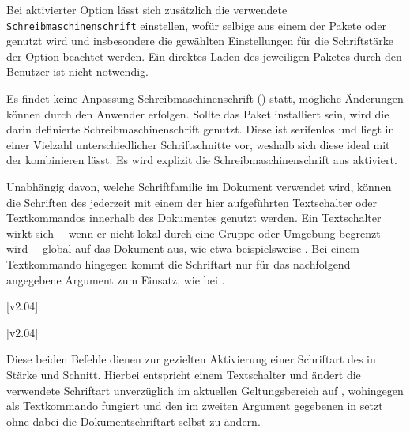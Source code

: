 \begin{DeclareEntity*}{}
\begin{DeclareEntity*}{}
\begin{DeclareEntity*}{}
\begin{Declaration}
%
Bei aktivierter Option  lässt sich zusätzlich die verwendete
\texttt{Schreibmaschinenschrift} einstellen, wofür selbige aus einem der Pakete 
 oder  genutzt wird und insbesondere die 
gewählten Einstellungen für die Schriftstärke der Option  
beachtet werden. Ein direktes Laden des jeweiligen Paketes durch den Benutzer 
ist nicht notwendig.
\begin{DeclareValues}{}
  Es findet keine Anpassung Schreibmaschinenschrift () statt, 
  mögliche Änderungen können durch den Anwender erfolgen.
  Sollte das Paket  installiert sein, wird die darin 
  definierte Schreibmaschinenschrift genutzt. Diese ist serifenlos und liegt in 
  einer Vielzahl unterschiedlicher Schriftschnitte vor, weshalb sich diese 
  ideal mit der \OpenSans kombinieren lässt.
  Es wird explizit die Schreibmaschinenschrift aus  aktiviert. 
\end{DeclareValues}
\end{Declaration}



Unabhängig davon, welche Schriftfamilie im Dokument verwendet wird, können die 
Schriften des \CDs jederzeit mit einem der hier aufgeführten Textschalter oder 
Textkommandos innerhalb des Dokumentes genutzt werden. Ein Textschalter wirkt 
sich~-- wenn er nicht lokal durch eine Gruppe oder Umgebung begrenzt wird~-- 
global auf das Dokument aus, wie etwa beispielsweise . Bei 
einem Textkommando hingegen kommt die Schriftart nur für das nachfolgend 
angegebene Argument zum Einsatz, wie bei . 
%
\begin{Declaration}
  {}
  [v2.04]
\begin{Declaration}
  {}
  [v2.04]
\printdeclarationlist

Diese beiden Befehle dienen zur gezielten Aktivierung einer Schriftart des \CDs 
in Stärke und Schnitt. Hierbei entspricht  einem Textschalter und 
ändert die verwendete Schriftart unverzüglich im aktuellen Geltungsbereich auf 
, wohingegen  als Textkommando fungiert und den 
im zweiten Argument gegebenen  in  setzt ohne 
dabei die Dokumentschriftart selbst zu ändern.


\end{Declaration}
\end{Declaration}
\end{DeclareEntity*}
\end{DeclareEntity*}
\end{DeclareEntity*}
